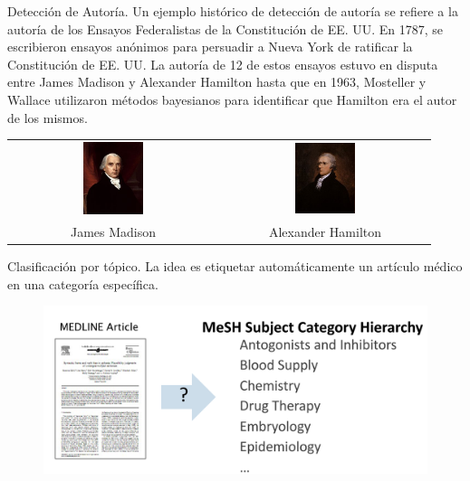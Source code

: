 \begin{example}
Detección de Autoría. Un ejemplo histórico de detección de autoría se refiere a la autoría de los Ensayos Federalistas de la Constitución de EE. UU. En 1787, se escribieron ensayos anónimos para persuadir a Nueva York de ratificar la Constitución de EE. UU. La autoría de 12 de estos ensayos estuvo en disputa entre James Madison y Alexander Hamilton hasta que en 1963, Mosteller y Wallace \cite{mosteller1963inference} utilizaron métodos bayesianos para identificar que Hamilton era el autor de los mismos.


\begin{table}[h]
    \centering
    \begin{tabular}{cc}
        \includegraphics[width=0.3\textwidth]{pics/madison.png} & \includegraphics[width=0.3\textwidth]{pics/hamilton.png} \\
        James Madison & Alexander Hamilton \\
    \end{tabular}
\end{table}



\end{example}


\begin{example}
Clasificación por tópico. La idea es etiquetar automáticamente un artículo médico en una categoría específica.

\begin{figure}[h]
\includegraphics[scale = 0.2]{pics/medarticle.png}
\end{figure}
 
\end{example}



